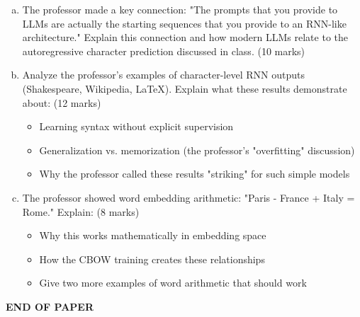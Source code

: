 \documentclass[12pt]{article}
\newcommand{\mediumanswer}{\vspace{3cm}}
\newcommand{\longanswer}{\vspace{4cm}}
\begin{document}
\begin{enumerate}[(a)]
    \item The professor made a key connection: "The prompts that you provide to LLMs are actually the starting sequences that you provide to an RNN-like architecture." Explain this connection and how modern LLMs relate to the autoregressive character prediction discussed in class. \hfill (10 marks)
    
    \mediumanswer
    
    \item Analyze the professor's examples of character-level RNN outputs (Shakespeare, Wikipedia, LaTeX). Explain what these results demonstrate about: \hfill (12 marks)
    \begin{itemize}
        \item Learning syntax without explicit supervision
        \item Generalization vs. memorization (the professor's "overfitting" discussion)
        \item Why the professor called these results "striking" for such simple models
    \end{itemize}
    
    \longanswer
    
    \item The professor showed word embedding arithmetic: "Paris - France + Italy = Rome." Explain: \hfill (8 marks)
    \begin{itemize}
        \item Why this works mathematically in embedding space
        \item How the CBOW training creates these relationships
        \item Give two more examples of word arithmetic that should work
    \end{itemize}
    
    \mediumanswer
\end{enumerate}

\vfill
\begin{center}{\bf END OF PAPER}\end{center}
\end{document}
